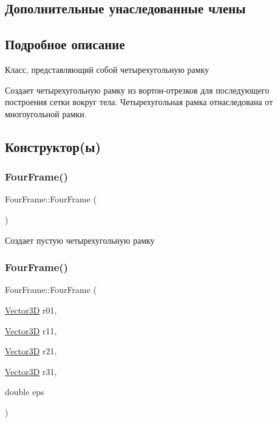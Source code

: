 \subsection*{Дополнительные унаследованные члены}


\subsection{Подробное описание}
Класс, представляющий собой четырехугольную рамку 

Создает четырехугольную рамку из вортон-\/отрезков для последующего построения сетки вокруг тела. Четырехугольная рамка отнаследована от многоугольной рамки. 

\subsection{Конструктор(ы)}
\mbox{\label{class_four_frame_a252bb2895455ee197e754daf9a9e5a8e}} 
\subsubsection{\texorpdfstring{Four\+Frame()}{FourFrame()}\hspace{0.1cm}{\footnotesize\ttfamily [1/2]}}
{\footnotesize\ttfamily Four\+Frame\+::\+Four\+Frame (\begin{DoxyParamCaption}{ }\end{DoxyParamCaption})}

Создает пустую четырехугольную рамку \mbox{\label{class_four_frame_a9ec3cece7b4b9fc37dc5205c98cd652a}} 
\subsubsection{\texorpdfstring{Four\+Frame()}{FourFrame()}\hspace{0.1cm}{\footnotesize\ttfamily [2/2]}}
{\footnotesize\ttfamily Four\+Frame\+::\+Four\+Frame (\begin{DoxyParamCaption}\item[{\mbox{\hyperlink{class_vector3_d}{Vector3D}}}]{r01,  }\item[{\mbox{\hyperlink{class_vector3_d}{Vector3D}}}]{r11,  }\item[{\mbox{\hyperlink{class_vector3_d}{Vector3D}}}]{r21,  }\item[{\mbox{\hyperlink{class_vector3_d}{Vector3D}}}]{r31,  }\item[{double}]{eps }\end{DoxyParamCaption})}

